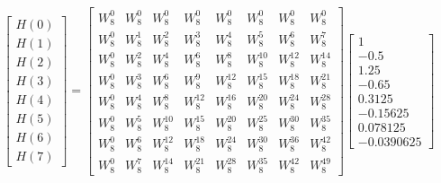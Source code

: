 \documentclass[journal,12pt,twocolumn]{IEEEtran}
\renewcommand\thesection{\arabic{section}}
\begin{document}
\begin{enumerate}[label=\thesection.\arabic*.,ref=\thesection.\theenumi]
\begin{equation}
\begin{bmatrix}
H(0) \\
H(1) \\
H(2) \\
H(3) \\
H(4) \\
H(5) \\
H(6) \\
H(7)
\end{bmatrix}
=
\begin{bmatrix}
W^{0}_{8} & W^{0}_{8} & W^{0}_{8} & W^{0}_{8} & W^{0}_{8} & W^{0}_{8} & W^{0}_{8} & W^{0}_{8}\\
W^{0}_{8} & W^{1}_{8} & W^{2}_{8} & W^{3}_{8} & W^{4}_{8} & W^{5}_{8} & W^{6}_{8} & W^{7}_{8}\\
W^{0}_{8} & W^{2}_{8} & W^{4}_{8} & W^{6}_{8} & W^{8}_{8} & W^{10}_{8} & W^{12}_{8} & W^{14}_{8}\\
W^{0}_{8} & W^{3}_{8} & W^{6}_{8} & W^{9}_{8} & W^{12}_{8} & W^{15}_{8} & W^{18}_{8} & W^{21}_{8}\\
W^{0}_{8} & W^{4}_{8} & W^{8}_{8} & W^{12}_{8} & W^{16}_{8} & W^{20}_{8} & W^{24}_{8} & W^{28}_{8}\\
W^{0}_{8} & W^{5}_{8} & W^{10}_{8} & W^{15}_{8} & W^{20}_{8} & W^{25}_{8} & W^{30}_{8} & W^{35}_{8}\\
W^{0}_{8} & W^{6}_{8} & W^{12}_{8} & W^{18}_{8} & W^{24}_{8} & W^{30}_{8} & W^{36}_{8} & W^{42}_{8}\\
W^{0}_{8} & W^{7}_{8} & W^{14}_{8} & W^{21}_{8} & W^{28}_{8} & W^{35}_{8} & W^{42}_{8} & W^{49}_{8}
\end{bmatrix}
\begin{bmatrix}
1 \\
-0.5 \\
1.25 \\
-0.65 \\
0.3125 \\
-0.15625 \\
0.078125 \\
-0.0390625
\end{bmatrix}
\end{equation}


\end{enumerate}
\end{document}

